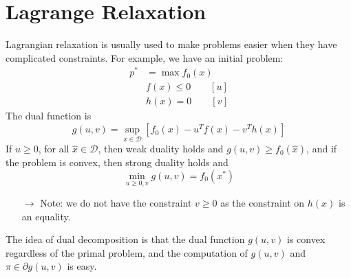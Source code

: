 \documentclass[12pt, openany]{report}
\theoremstyle{definition}
\begin{document}
\chapter{Lagrange Relaxation}
Lagrangian relaxation is usually used to make problems easier when they have complicated constraints. For example, we have an initial problem:
\begin{equation}
	\begin{aligned}
		p^* &= \max f_0(x)\\
		& f(x)\le 0 \qquad [u]\\
		& h(x) = 0 \qquad [v]
	\end{aligned}
\end{equation}
The dual function is 
\begin{equation}
	g(u,v) = \sup_{x\in \mathcal{D}} [f_0(x)-u^Tf(x)-v^Th(x)]
\end{equation}
If $u\ge0$, for all $\hat x\in \mathcal{D}$, then weak duality holds and $g(u,v)\ge f_0(\hat x)$, and if the problem is convex, then strong duality holds and 
\begin{equation}
	\min_{u\ge0,v} g(u,v)=f_0(x^*)
\end{equation}
\begin{itemize}
	\item [$\to$] Note: we do not have the constraint $v\ge0$ as the constraint on $h(x)$ is an equality.
\end{itemize}
The idea of dual decomposition is that the dual function $g(u,v)$ is convex regardless of the primal problem, and the computation of $g(u,v)$ and $\pi\in \partial g(u,v)$ is easy. 
\end{document}
